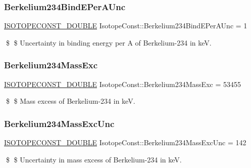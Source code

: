 \subsubsection{\texorpdfstring{Berkelium234\+Bind\+E\+Per\+A\+Unc}{Berkelium234BindEPerAUnc}}
{\footnotesize\ttfamily \mbox{\hyperlink{group___isotope_const-_macros_ga8f45a7272ce02c0b4c65c44636ed719a}{I\+S\+O\+T\+O\+P\+E\+C\+O\+N\+S\+T\+\_\+\+D\+O\+U\+B\+LE}} Isotope\+Const\+::\+Berkelium234\+Bind\+E\+Per\+A\+Unc = 1}

\$ \$ Uncertainty in binding energy per A of Berkelium-\/234 in keV. \mbox{\label{group___isotope_const-_berkelium-_bk234_gaade22619d96c725dd97511971a95dba2}} 
\subsubsection{\texorpdfstring{Berkelium234\+Mass\+Exc}{Berkelium234MassExc}}
{\footnotesize\ttfamily \mbox{\hyperlink{group___isotope_const-_macros_ga8f45a7272ce02c0b4c65c44636ed719a}{I\+S\+O\+T\+O\+P\+E\+C\+O\+N\+S\+T\+\_\+\+D\+O\+U\+B\+LE}} Isotope\+Const\+::\+Berkelium234\+Mass\+Exc = 53455}

\$ \$ Mass excess of Berkelium-\/234 in keV. \mbox{\label{group___isotope_const-_berkelium-_bk234_ga15fc67ff28b35be6c064cbc74b64a3d3}} 
\subsubsection{\texorpdfstring{Berkelium234\+Mass\+Exc\+Unc}{Berkelium234MassExcUnc}}
{\footnotesize\ttfamily \mbox{\hyperlink{group___isotope_const-_macros_ga8f45a7272ce02c0b4c65c44636ed719a}{I\+S\+O\+T\+O\+P\+E\+C\+O\+N\+S\+T\+\_\+\+D\+O\+U\+B\+LE}} Isotope\+Const\+::\+Berkelium234\+Mass\+Exc\+Unc = 142}

\$ \$ Uncertainty in mass excess of Berkelium-\/234 in keV. \mbox{\label{group___isotope_const-_berkelium-_bk234_ga7feffbb15472103aad5c513143ddaabe}} 
